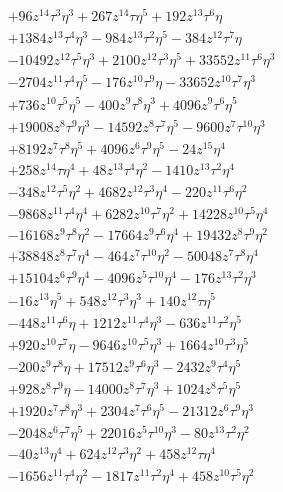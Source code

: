 {\begin{align*}
&+96z^{14}\tau^{3}\eta^{3}+267z^{14}\tau\eta^{5}+192z^{13}\tau^{6}\eta\\
&+1384z^{13}\tau^{4}\eta^{3}-984z^{13}\tau^{2}\eta^{5}-384z^{12}\tau^{7}\eta\\
&-10492z^{12}\tau^{5}\eta^{3}+2100z^{12}\tau^{3}\eta^{5}+33552z^{11}\tau^{6}\eta^{3}\\
&-2704z^{11}\tau^{4}\eta^{5}-176z^{10}\tau^{9}\eta-33652z^{10}\tau^{7}\eta^{3}\\
&+736z^{10}\tau^{5}\eta^{5}-400z^{9}\tau^{8}\eta^{3}+4096z^{9}\tau^{6}\eta^{5}\\
&+19008z^{8}\tau^{9}\eta^{3}-14592z^{8}\tau^{7}\eta^{5}-9600z^{7}\tau^{10}\eta^{3}\\
&+8192z^{7}\tau^{8}\eta^{5}+4096z^{6}\tau^{9}\eta^{5}-24z^{15}\eta^{4}\\
&+258z^{14}\tau\eta^{4}+48z^{13}\tau^{4}\eta^{2}-1410z^{13}\tau^{2}\eta^{4}\\
&-348z^{12}\tau^{5}\eta^{2}+4682z^{12}\tau^{3}\eta^{4}-220z^{11}\tau^{6}\eta^{2}\\
&-9868z^{11}\tau^{4}\eta^{4}+6282z^{10}\tau^{7}\eta^{2}+14228z^{10}\tau^{5}\eta^{4}\\
&-16168z^{9}\tau^{8}\eta^{2}-17664z^{9}\tau^{6}\eta^{4}+19432z^{8}\tau^{9}\eta^{2}\\
&+38848z^{8}\tau^{7}\eta^{4}-464z^{7}\tau^{10}\eta^{2}-50048z^{7}\tau^{8}\eta^{4}\\
&+15104z^{6}\tau^{9}\eta^{4}-4096z^{5}\tau^{10}\eta^{4}-176z^{13}\tau^{2}\eta^{3}\\
&-16z^{13}\eta^{5}+548z^{12}\tau^{3}\eta^{3}+140z^{12}\tau\eta^{5}\\
&-448z^{11}\tau^{6}\eta+1212z^{11}\tau^{4}\eta^{3}-636z^{11}\tau^{2}\eta^{5}\\
&+920z^{10}\tau^{7}\eta-9646z^{10}\tau^{5}\eta^{3}+1664z^{10}\tau^{3}\eta^{5}\\
&-200z^{9}\tau^{8}\eta+17512z^{9}\tau^{6}\eta^{3}-2432z^{9}\tau^{4}\eta^{5}\\
&+928z^{8}\tau^{9}\eta-14000z^{8}\tau^{7}\eta^{3}+1024z^{8}\tau^{5}\eta^{5}\\
&+1920z^{7}\tau^{8}\eta^{3}+2304z^{7}\tau^{6}\eta^{5}-21312z^{6}\tau^{9}\eta^{3}\\
&-2048z^{6}\tau^{7}\eta^{5}+22016z^{5}\tau^{10}\eta^{3}-80z^{13}\tau^{2}\eta^{2}\\
&-40z^{13}\eta^{4}+624z^{12}\tau^{3}\eta^{2}+458z^{12}\tau\eta^{4}\\
&-1656z^{11}\tau^{4}\eta^{2}-1817z^{11}\tau^{2}\eta^{4}+458z^{10}\tau^{5}\eta^{2}\\

\end{align*}}
